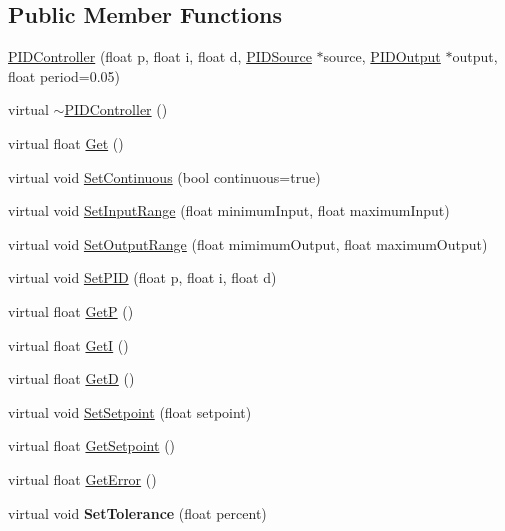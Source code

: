 \subsection*{Public Member Functions}
\begin{DoxyCompactItemize}
\item 
\hyperlink{classPIDController_aeb0e62ab4c39e61826b71b4177eb97d5}{PIDController} (float p, float i, float d, \hyperlink{classPIDSource}{PIDSource} $\ast$source, \hyperlink{classPIDOutput}{PIDOutput} $\ast$output, float period=0.05)
\item 
virtual \hyperlink{classPIDController_a690e7ad4796e5c5143aa4b90f2f6677b}{$\sim$PIDController} ()
\item 
virtual float \hyperlink{classPIDController_a5d096c87981f6612fe0cf496cea9772a}{Get} ()
\item 
virtual void \hyperlink{classPIDController_adc068e4069028a0546fad0bee0ef32ca}{SetContinuous} (bool continuous=true)
\item 
virtual void \hyperlink{classPIDController_aa105ab2c2020dfc767fe9b585be0103a}{SetInputRange} (float minimumInput, float maximumInput)
\item 
virtual void \hyperlink{classPIDController_afa64ecde5d075a47a4cd1431f77b6060}{SetOutputRange} (float mimimumOutput, float maximumOutput)
\item 
virtual void \hyperlink{classPIDController_a1e4bf6acfb4eccb1b38f3f74ef74f995}{SetPID} (float p, float i, float d)
\item 
virtual float \hyperlink{classPIDController_a9572c875b0fee00189e7e22250db3831}{GetP} ()
\item 
virtual float \hyperlink{classPIDController_aad4c914184a37b8ceb85401d59ff163b}{GetI} ()
\item 
virtual float \hyperlink{classPIDController_a003738f4df587babc119131cdfada553}{GetD} ()
\item 
virtual void \hyperlink{classPIDController_a60e89182f28d2cc1ee5adf481c2003c9}{SetSetpoint} (float setpoint)
\item 
virtual float \hyperlink{classPIDController_ac25eb01ba2a0118f692bae207de62d63}{GetSetpoint} ()
\item 
virtual float \hyperlink{classPIDController_aba10571498bacd21469121d4af1f4757}{GetError} ()
\item 
\hypertarget{classPIDController_a86cba2e65c803b3f3d2c63ea0dfdaec4}{
virtual void {\bfseries SetTolerance} (float percent)}
\label{classPIDController_a86cba2e65c803b3f3d2c63ea0dfdaec4}


\end{DoxyCompactItemize}
